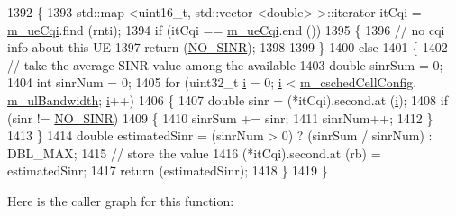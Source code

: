\begin{DoxyCode}
1392 \{
1393   std::map <uint16\_t, std::vector <double> >::iterator itCqi = \hyperlink{classns3_1_1FdBetFfMacScheduler_a8cb7a6ccbbc1ee0a6dd2872cdc9d131e}{m\_ueCqi}.find (rnti);
1394   \textcolor{keywordflow}{if} (itCqi == \hyperlink{classns3_1_1FdBetFfMacScheduler_a8cb7a6ccbbc1ee0a6dd2872cdc9d131e}{m\_ueCqi}.end ())
1395     \{
1396       \textcolor{comment}{// no cqi info about this UE}
1397       \textcolor{keywordflow}{return} (\hyperlink{cqa-ff-mac-scheduler_8h_a520d71777be043568160c783a9c65fd5}{NO\_SINR});
1398 
1399     \}
1400   \textcolor{keywordflow}{else}
1401     \{
1402       \textcolor{comment}{// take the average SINR value among the available}
1403       \textcolor{keywordtype}{double} sinrSum = 0;
1404       \textcolor{keywordtype}{int} sinrNum = 0;
1405       \textcolor{keywordflow}{for} (uint32\_t \hyperlink{bernuolliDistribution_8m_a6f6ccfcf58b31cb6412107d9d5281426}{i} = 0; \hyperlink{bernuolliDistribution_8m_a6f6ccfcf58b31cb6412107d9d5281426}{i} < \hyperlink{classns3_1_1FdBetFfMacScheduler_a52a10018d36c6a2e69820346a327dfc9}{m\_cschedCellConfig}.
      \hyperlink{structns3_1_1FfMacCschedSapProvider_1_1CschedCellConfigReqParameters_a5ab5b102878e6e7e7727a14af4a64d2f}{m\_ulBandwidth}; \hyperlink{bernuolliDistribution_8m_a6f6ccfcf58b31cb6412107d9d5281426}{i}++)
1406         \{
1407           \textcolor{keywordtype}{double} sinr = (*itCqi).second.at (\hyperlink{bernuolliDistribution_8m_a6f6ccfcf58b31cb6412107d9d5281426}{i});
1408           \textcolor{keywordflow}{if} (sinr != \hyperlink{cqa-ff-mac-scheduler_8h_a520d71777be043568160c783a9c65fd5}{NO\_SINR})
1409             \{
1410               sinrSum += sinr;
1411               sinrNum++;
1412             \}
1413         \}
1414       \textcolor{keywordtype}{double} estimatedSinr = (sinrNum > 0) ? (sinrSum / sinrNum) : DBL\_MAX;
1415       \textcolor{comment}{// store the value}
1416       (*itCqi).second.at (rb) = estimatedSinr;
1417       \textcolor{keywordflow}{return} (estimatedSinr);
1418     \}
1419 \}
\end{DoxyCode}


Here is the caller graph for this function\+:


